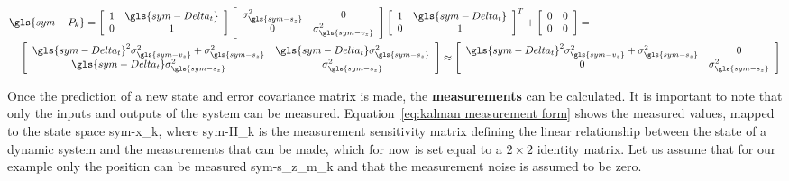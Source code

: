 \begin{equation}
    \label{eq:kalman example P}
    \begin{multlined}[b]
        \gls{sym-P_k} =
        \left[\begin{array}{cc}
                  1 & \gls{sym-Delta_t} \\
                  0 & 1
        \end{array}\right]
        \left[\begin{array}{cc}
                  \sigma_{\gls{sym-s_z} }^{2} & 0                           \\
                  0                           & \sigma_{\gls{sym-v_z} }^{2}
        \end{array}\right]
        \left[\begin{array}{cc}
                  1 & \gls{sym-Delta_t} \\
                  0 & 1
        \end{array}\right]^{T}
        +
        \left[\begin{array}{cc}
                  0 & 0 \\
                  0 & 0
        \end{array}\right]
        = \\ \left[\begin{array}{cc}
                       \gls{sym-Delta_t}^2 \sigma_{\gls{sym-v_z} }^{2} + \sigma_{\gls{sym-s_z} }^{2} & 
					   \gls{sym-Delta_t} \sigma_{\gls{sym-s_z} }^{2} \\
                       \gls{sym-Delta_t} \sigma_{\gls{sym-s_z} }^{2}                                 & 
					   \sigma_{\gls{sym-s_z} }^{2}
        \end{array}\right]
        \approx
        \left[\begin{array}{cc}
                  \gls{sym-Delta_t}^2 \sigma_{\gls{sym-v_z} }^{2} + \sigma_{\gls{sym-s_z} }^{2} & 0                  
				  \\
                  0                                                                             & 
				  \sigma_{\gls{sym-s_z} }^{2}
        \end{array}\right]
    \end{multlined}
\end{equation}

Once the prediction of a new state and error covariance matrix is made, the \textbf{measurements} can be calculated. It
is important to note that only the inputs and outputs of the system can be measured. Equation~\ref{eq:kalman measurement
form} shows the measured values, mapped to the state space \gls{sym-x_k}, where \gls{sym-H_k} is the measurement
sensitivity matrix defining the linear relationship between the state of a dynamic system and the measurements that can
be made, which for now is set equal to a \( 2 \times 2 \) identity matrix. Let us assume that for our example only the
position can be measured \gls{sym-s_z_m_k} and that the measurement noise is assumed to be zero.

